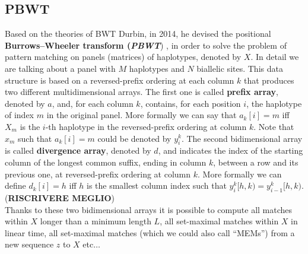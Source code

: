 \documentclass[a4paper,11pt, oneside]{article}
\begin{document}
\subsection*{PBWT}
Based on the theories of BWT Durbin, in 2014, he devised the positional
\textbf{Burrows–Wheeler transform (\textit{PBWT}}) \cite{pbwt}, in order to
solve the problem of pattern matching on panels (matrices) of haplotypes,
denoted by $X$. In
detail we are talking about a panel with $M$ haplotypes and $N$ biallelic
sites. This data structure is based on a reversed-prefix ordering at each column
$k$ that produces two different multidimensional arrays. The first one is called
\textbf{prefix array}, denoted by $a$, and, for each column $k$, contains, for
each position $i$, the haplotype of index $m$ in the original panel. More
formally we can say that $a_k[i]=m$ iff $X_m$ is the $i$-th haplotype in the
reversed-prefix ordering at column $k$. Note that $x_m$ such that $a_k[i]=m$
could be denoted by $y_i^k$. The second bidimensional array is
called \textbf{divergence array}, denoted by $d$, and indicates the index of the
starting column of the longest common suffix, ending in column $k$, between a
row and its previous one, at reversed-prefix ordering at column $k$. More
formally we can define $d_k[i]=h$ iff $h$ is the smallest column index such that
$y_i^k[h,k)=y_{i-1}^k[h,k)$. (\textbf{RISCRIVERE MEGLIO})\\
Thanks to these two bidimensional arrays it is possible to compute all matches
within $X$ longer than a minimum length $L$, all set-maximal matches within $X$
in linear time, all set-maximal matches (which we could also call ``MEMs'') from
a new sequence $z$ to $X$ etc$\ldots$ 
\end{document}
